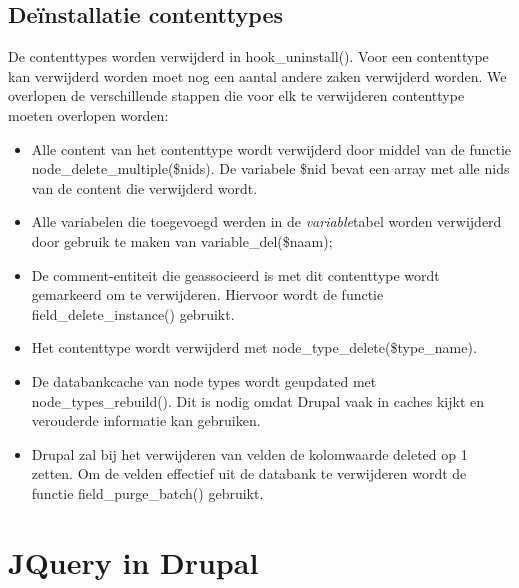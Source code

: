 \subsection{De\"{i}nstallatie contenttypes}
De contenttypes worden verwijderd in hook\_uninstall(). Voor een contenttype kan verwijderd worden moet nog een aantal andere zaken verwijderd worden. We overlopen de verschillende stappen die voor elk te verwijderen contenttype moeten overlopen worden:
\begin{itemize}
\item Alle content van het contenttype wordt verwijderd door middel van de functie\\ node\_delete\_multiple(\$nids). De variabele \$nid bevat een array met alle nids van de content die verwijderd wordt.
\item Alle variabelen die toegevoegd werden in de \textit{variable}tabel worden verwijderd door gebruik te maken van variable\_del(\$naam);
\item De comment-entiteit die geassocieerd is met dit contenttype wordt gemarkeerd om te verwijderen. Hiervoor wordt de functie field\_delete\_instance() gebruikt.
\item Het contenttype wordt verwijderd met node\_type\_delete(\$type\_name).
\item De databankcache van node types wordt geupdated met node\_types\_rebuild(). Dit is nodig omdat Drupal vaak in caches kijkt en verouderde informatie kan gebruiken.
\item Drupal zal bij het verwijderen van velden de kolomwaarde deleted op 1 zetten. Om de velden effectief uit de databank te verwijderen wordt de functie field\_purge\_batch() gebruikt.
\end{itemize}

\section{JQuery in Drupal} \label{jQuery}

